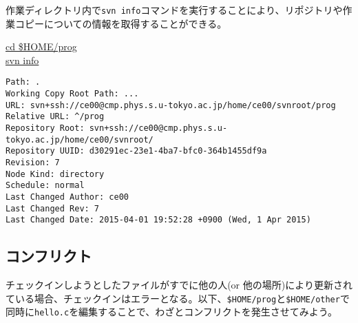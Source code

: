 作業ディレクトリ内で{\tt svn info}コマンドを実行することにより、リポジトリや作業コピーについての情報を取得することができる。
\begin{commandline2}
\prompt \underline{cd \$HOME/prog} \\
\prompt \underline{svn info}
\vspace*{-.7em} 
\begin{verbatim}
Path: .
Working Copy Root Path: ...
URL: svn+ssh://ce00@cmp.phys.s.u-tokyo.ac.jp/home/ce00/svnroot/prog
Relative URL: ^/prog
Repository Root: svn+ssh://ce00@cmp.phys.s.u-tokyo.ac.jp/home/ce00/svnroot/
Repository UUID: d30291ec-23e1-4ba7-bfc0-364b1455df9a
Revision: 7
Node Kind: directory
Schedule: normal
Last Changed Author: ce00
Last Changed Rev: 7
Last Changed Date: 2015-04-01 19:52:28 +0900 (Wed, 1 Apr 2015)
\end{verbatim}
\end{commandline2} \noindent

\subsection{コンフリクト}

チェックインしようとしたファイルがすでに他の人(or 他の場所)により更新されている場合、チェックインはエラーとなる。以下、{\tt \$HOME/prog}と{\tt \$HOME/other}で同時に{\tt hello.c}を編集することで、わざとコンフリクトを発生させてみよう。

